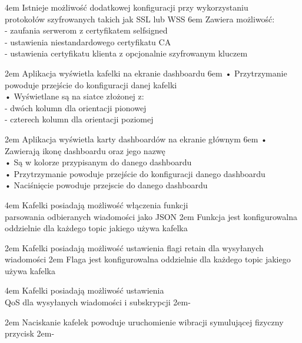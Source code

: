 {4em}{
    Istnieje możliwość dodatkowej konfiguracji przy wykorzystaniu\\
    protokołów szyfrowanych takich jak SSL lub WSS
}
{6em}{
    Zawiera możliwość:\\
    - zaufania serwerom z certyfikatem selfsigned\\
    - ustawienia niestandardowego certyfikatu CA\\
    - ustawienia certyfikatu klienta z opcjonalnie szyfrowanym kluczem
}

{2em}{
    Aplikacja wyświetla kafelki na ekranie dashboardu
}
{6em}{
    • Przytrzymanie powoduje przejście do konfiguracji danej kafelki\\
    • Wyświetlane są na siatce złożonej z:\\
    - dwóch kolumn dla orientacji pionowej\\
    - czterech kolumn dla orientacji poziomej
}

{2em}{
    Aplikacja wyświetla karty dashboardów na ekranie głównym
}
{6em}{
    • Zawierają ikonę dashboardu oraz jego nazwę\\
    • Są w kolorze przypisanym do danego dashboardu\\
    • Przytrzymanie powoduje przejście do konfiguracji danego dashboardu\\
    • Naciśnięcie powoduje przejscie do danego dashboardu
}

{4em}{
    Kafelki posiadają możliwość włączenia funkcji\\
    parsowania odbieranych wiadomości jako JSON
}
{2em}{
    Funkcja jest konfigurowalna oddzielnie dla każdego topic jakiego używa kafelka
}

{2em}{
    Kafelki posiadają możliwość ustawienia flagi retain dla wysyłanych wiadomości
}
{2em}{
    Flaga jest konfigurowalna oddzielnie dla każdego topic jakiego używa kafelka
}

{4em}{
    Kafelki posiadają możliwość ustawienia\\
    QoS dla wysyłanych wiadomości i subskrypcji
}
{2em}{-}

{2em}{
    Naciskanie kafelek powoduje uruchomienie wibracji symulującej fizyczny przycisk
}
{2em}{-}

